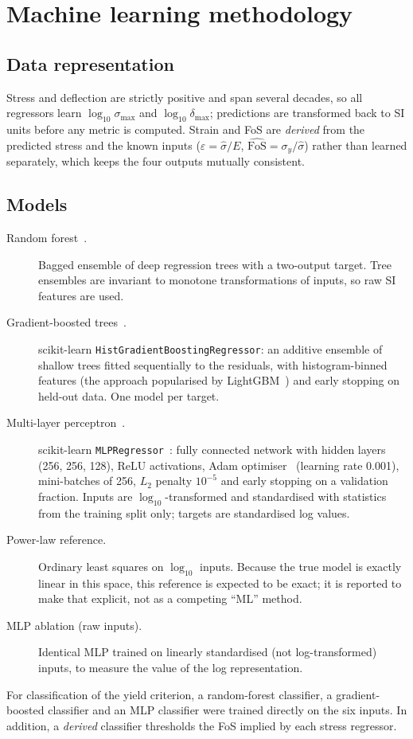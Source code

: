 \documentclass[11pt,a4paper]{article}
\newcommand{\smax}{\sigma_{\max}}
\newcommand{\dmax}{\delta_{\max}}
\begin{document}
\section{Machine learning methodology}
\subsection{Data representation}
Stress and deflection are strictly positive and span several decades, so all regressors learn
$\log_{10}\smax$ and $\log_{10}\dmax$; predictions are transformed back to SI units before any metric is computed.
Strain and FoS are \emph{derived} from the predicted stress and the known inputs ($\varepsilon=\hat\sigma/E$,
$\widehat{\mathrm{FoS}}=\sigma_y/\hat\sigma$) rather than learned separately, which keeps the four outputs mutually
consistent.

\subsection{Models}
\begin{description}
\item[Random forest~\cite{breiman2001}.] Bagged ensemble of deep regression trees with a two-output target. Tree
ensembles are invariant to monotone transformations of inputs, so raw SI features are used.
\item[Gradient-boosted trees~\cite{friedman2001}.] scikit-learn \texttt{HistGradientBoostingRegressor}: an additive ensemble of shallow trees fitted sequentially to the residuals, with histogram-binned features (the approach popularised by LightGBM~\cite{ke2017}) and early stopping on held-out data. One model per target.
\item[Multi-layer perceptron~\cite{hornik1989}.] scikit-learn \texttt{MLPRegressor}~\cite{pedregosa2011}: fully connected network with hidden layers (256, 256, 128), ReLU activations, Adam optimiser~\cite{kingma2015} (learning rate 0.001), mini-batches of 256, $L_2$ penalty $10^{-5}$ and early stopping on a validation fraction. Inputs are $\log_{10}$-transformed and standardised
with statistics from the training split only; targets are standardised log values.
\item[Power-law reference.] Ordinary least squares on $\log_{10}$ inputs. Because the true model is exactly linear in
this space, this reference is expected to be exact; it is reported to make that explicit, not as a competing ``ML'' method.
\item[MLP ablation (raw inputs).] Identical MLP trained on linearly standardised (not log-transformed) inputs, to
measure the value of the log representation.
\end{description}
For classification of the yield criterion, a random-forest classifier, a gradient-boosted classifier and an MLP
classifier were trained directly on the six inputs. In addition, a \emph{derived} classifier thresholds the FoS implied by
each stress regressor.
\end{document}
